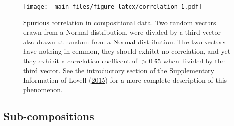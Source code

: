 \documentclass[onecolumn]{book}
\newenvironment{Shaded}{\begin{snugshade}}{\end{snugshade}}
\newcommand{\DataTypeTok}[1]{\textcolor[rgb]{0.13,0.29,0.53}{#1}}
\newcommand{\DecValTok}[1]{\textcolor[rgb]{0.00,0.00,0.81}{#1}}
\newcommand{\FloatTok}[1]{\textcolor[rgb]{0.00,0.00,0.81}{#1}}
\newcommand{\KeywordTok}[1]{\textcolor[rgb]{0.13,0.29,0.53}{\textbf{#1}}}
\newcommand{\NormalTok}[1]{#1}
\newcommand{\OperatorTok}[1]{\textcolor[rgb]{0.81,0.36,0.00}{\textbf{#1}}}
\newcommand{\StringTok}[1]{\textcolor[rgb]{0.31,0.60,0.02}{#1}}
\theoremstyle{definition}
\theoremstyle{definition}
\theoremstyle{definition}
\theoremstyle{remark}
\begin{document}
\begin{Shaded}
\end{Shaded}

\begin{figure}
\centering
\texttt{[image: \_main\_files/figure-latex/correlation-1.pdf]}
\caption{\label{fig:correlation}Spurious correlation in compositional data.
Two random vectors drawn from a Normal distribution, were divided by a
third vector also drawn at random from a Normal distribution. The two
vectors have nothing in common, they should exhibit no correlation, and
yet they exhibit a correlation coefficent of \(>0.65\) when divided by
the third vector. See the introductory section of the Supplementary
Information of Lovell (\protect\hyperlink{ref-Lovell:2015}{2015}) for a
more complete description of this phenomenon.}
\end{figure}

\hypertarget{sub-compositions}{%
\subsection{Sub-compositions}\label{sub-compositions}}
\end{document}

